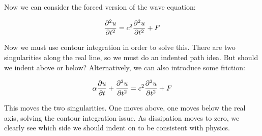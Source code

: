 \documentclass{article}
\theoremstyle{definition}
\begin{document}
Now we can consider the forced version of the wave equation:

\begin{align*}
\pdv{^2u}{t^2} = c^2 \pdv{^2 u}{t^2} + F
\end{align*}

Now we must use contour integration in order to solve this. There are two singularities along the real line, so we must do an indented path idea. But should we indent above or below? Alternatively, we can also introduce some friction:

\begin{align*}
\alpha \pdv{u}{t} + \pdv{^2u}{t^2} = c^2 \pdv{^2 u}{t^2} + F
\end{align*}

This moves the two singularities. One moves above, one moves below the real axis, solving the contour integration issue. As dissipation moves to zero, we clearly see which side we should indent on to be consistent with physics. 


\end{document}
